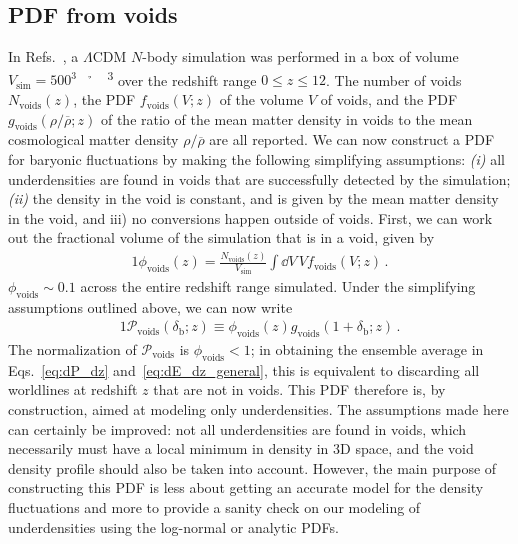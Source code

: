 \documentclass[prd,aps,10pt,nofootinbib,twocolumn,superscriptaddress,preprintnumbers,balancelastpage,longbibliography]{revtex4-1}
\begin{document}
\subsection{PDF from voids}

In Refs.~\cite{Adermann:2017izw,Adermann:2018jba}, a $\Lambda$CDM $N$-body simulation was performed in a box of volume $V_\text{sim} = 500^3 \, $\SI{}{\per\h\cubed \mega\parsec\cubed} over the redshift range $0 \leq z \leq 12$. 
The number of voids $N_\text{voids}(z)$, the PDF $f_\text{voids}(V;z)$ of the volume $V$ of voids, and the PDF $g_\text{voids}(\rho/\overline{\rho}; z)$ of the ratio of the mean matter density in voids to the mean cosmological matter density $\rho/\overline{\rho}$ are all reported. 
We can now construct a PDF for baryonic fluctuations by making the following simplifying assumptions: \emph{(i)} all underdensities are found in voids that are successfully detected by the simulation; \emph{(ii)} the density in the void is constant, and is given by the mean matter density in the void, and iii) no conversions happen outside of voids. First, we can work out the fractional volume of the simulation that is in a void, given by
%
\begin{alignat}{1}
    \phi_\text{voids}(z) = \frac{N_\text{voids}(z)}{V_\text{sim}} \int \dd V \, V f_\text{voids}(V;z) \,.
\end{alignat}
%
$\phi_\text{voids} \sim 0.1$ across the entire redshift range simulated. Under the simplifying assumptions outlined above, we can now write
%
\begin{alignat}{1}
    \mathcal{P}_\text{voids}(\delta_\text{b};z) \equiv \phi_\text{voids}(z) g_\text{voids}(1 + \delta_\text{b}; z) \,.
\end{alignat}
%
The normalization of $\mathcal{P}_\text{voids}$ is $\phi_\text{voids} < 1$; in obtaining the ensemble average in Eqs.~\eqref{eq:dP_dz} and~\eqref{eq:dE_dz_general}, this is equivalent to discarding all worldlines at redshift $z$ that are not in voids. 
This PDF therefore is, by construction, aimed at modeling only underdensities. 
The assumptions made here can certainly be improved: not all underdensities are found in voids, which necessarily must have a local minimum in density in 3D space, and the void density profile should also be taken into account. 
However, the main purpose of constructing this PDF is less about getting an accurate model for the density fluctuations and more to provide a sanity check on our modeling of underdensities using the log-normal or analytic PDFs. 
\end{document}
